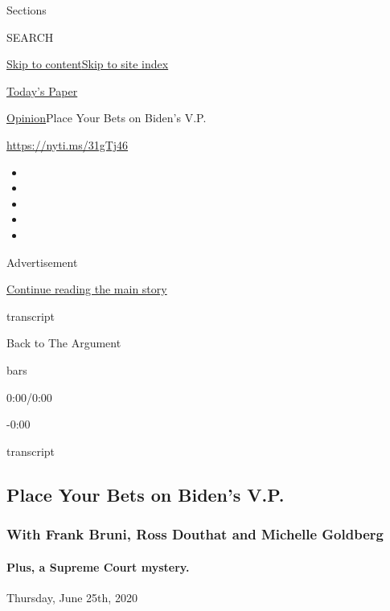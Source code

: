 Sections

SEARCH

\protect\hyperlink{site-content}{Skip to
content}\protect\hyperlink{site-index}{Skip to site index}

\href{https://myaccount.nytimes3xbfgragh.onion/auth/login?response_type=cookie\&client_id=vi}{}

\href{https://www.nytimes3xbfgragh.onion/section/todayspaper}{Today's
Paper}

\href{/section/opinion}{Opinion}\textbar{}Place Your Bets on Biden's
V.P.

\url{https://nyti.ms/31gTj46}

\begin{itemize}
\item
\item
\item
\item
\item
\end{itemize}

Advertisement

\protect\hyperlink{after-top}{Continue reading the main story}

transcript

Back to The Argument

bars

0:00/0:00

-0:00

transcript

\hypertarget{place-your-bets-on-bidens-vp}{%
\subsection{Place Your Bets on Biden's
V.P.}\label{place-your-bets-on-bidens-vp}}

\hypertarget{with-frank-bruni-ross-douthat-and-michelle-goldberg}{%
\subsubsection{With Frank Bruni, Ross Douthat and Michelle
Goldberg}\label{with-frank-bruni-ross-douthat-and-michelle-goldberg}}

\hypertarget{plus-a-supreme-court-mystery}{%
\paragraph{Plus, a Supreme Court
mystery.}\label{plus-a-supreme-court-mystery}}

Thursday, June 25th, 2020

